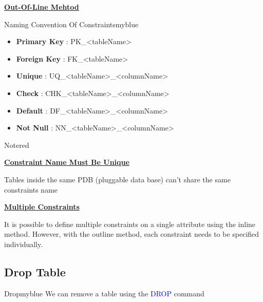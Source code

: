 \vspace{0.5cm}
\textbf{\underline{Out-Of-Line Mehtod}}

\vspace{0.25cm}


\vspace{1cm}
\begin{prettyBox}{Naming Convention Of Constraints}{myblue}
  \begin{itemize}
        \item  \textbf{Primary Key} : PK\_\textless tableName\textgreater  
        \item  \textbf{Foreign Key} : FK\_\textless tableName\textgreater
        \item  \textbf{Unique} : UQ\_\textless tableName\textgreater\_\textless columnName\textgreater
        \item  \textbf{Check} : CHK\_\textless tableName\textgreater\_\textless columnName\textgreater
        \item  \textbf{Default} : DF\_\textless tableName\textgreater\_\textless columnName\textgreater
        \item  \textbf{Not Null} : NN\_\textless tableName\textgreater\_\textless columnName\textgreater
    \end{itemize}   
\end{prettyBox}

\begin{prettyBox}{Note}{red}

    \textbf{\underline{Constraint Name Must Be Unique}}

\vspace{0.15cm}
Tables inside the same PDB (pluggable data base) can't share the same constraints name

\vspace{0.25cm}
\textbf{\underline{Multiple Constraints}}

\vspace{0.15cm}
It is possible to define multiple constraints on a single attribute using the inline method. 
However, with the outline method, each constraint needs to be specified individually.

\end{prettyBox}


\subsection{Drop Table}
\begin{prettyBox}{Drop}{myblue}
    We can remove a table using the \textcolor{blue}{DROP} command
\end{prettyBox}

